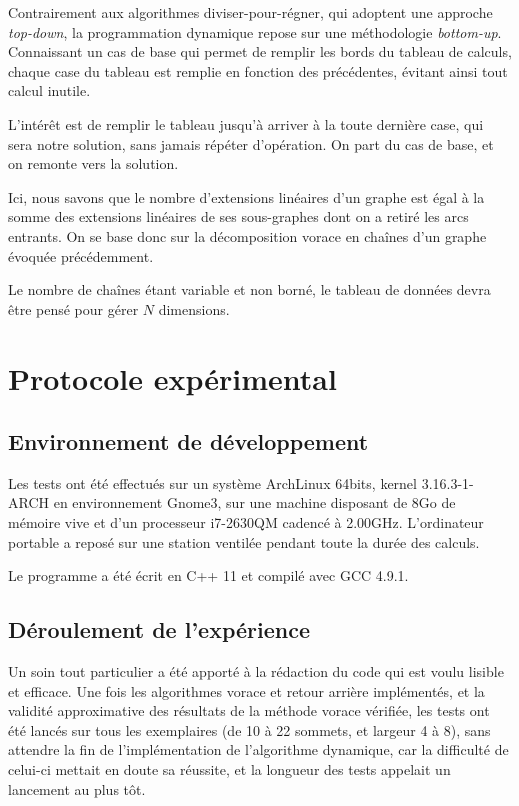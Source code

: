 \documentclass[10pt,a4paper]{article}
\begin{document}
Contrairement aux algorithmes diviser-pour-régner, qui adoptent une approche \textit{top-down}, la programmation dynamique repose sur une méthodologie \textit{bottom-up}. Connaissant un cas de base qui permet de remplir les \og bords \fg du tableau de calculs, chaque case du tableau est remplie en fonction des précédentes, évitant ainsi tout calcul inutile.

L'intérêt est de remplir le tableau jusqu'à arriver à la toute dernière case, qui sera notre solution, sans jamais répéter d'opération. On part du cas de base, et on remonte vers la solution.

Ici, nous savons que le nombre d'extensions linéaires d'un graphe est égal à la somme des extensions linéaires de ses sous-graphes dont on a retiré les arcs entrants. On se base donc sur la décomposition vorace en chaînes d'un graphe évoquée précédemment.

Le nombre de chaînes étant variable et non borné, le tableau de données devra être pensé pour gérer $ N $ dimensions.

\section{Protocole expérimental}

\subsection{Environnement de développement}

Les tests ont été effectués sur un système ArchLinux 64bits, kernel 3.16.3-1-ARCH en environnement Gnome3, sur une machine disposant de 8Go de mémoire vive et d'un processeur i7-2630QM cadencé à 2.00GHz. L'ordinateur portable a reposé sur une station ventilée pendant toute la durée des calculs.

Le programme a été écrit en C++ 11 et compilé avec GCC 4.9.1.

\subsection{Déroulement de l'expérience}

Un soin tout particulier a été apporté à la rédaction du code qui est voulu lisible et efficace.
Une fois les algorithmes vorace et retour arrière implémentés, et la validité approximative des résultats de la méthode vorace vérifiée, les tests ont été lancés sur tous les exemplaires (de 10 à 22 sommets, et largeur 4 à 8), sans attendre la fin de l'implémentation de l'algorithme dynamique, car la difficulté de celui-ci mettait en doute sa réussite, et la longueur des tests appelait un lancement au plus tôt.
\end{document}
